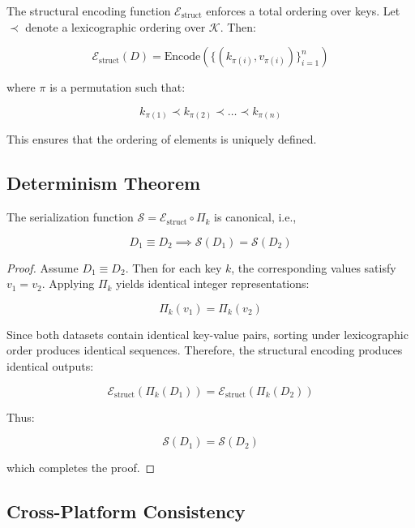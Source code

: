 The structural encoding function $\mathcal{E}_{\text{struct}}$ enforces a total ordering over keys. Let $\prec$ denote a lexicographic ordering over $\mathcal{K}$. Then:

\begin{equation}
\mathcal{E}_{\text{struct}}(D) = \text{Encode}(\{(k_{\pi(i)}, v_{\pi(i)})\}_{i=1}^{n})
\end{equation}

where $\pi$ is a permutation such that:

\begin{equation}
k_{\pi(1)} \prec k_{\pi(2)} \prec \dots \prec k_{\pi(n)}
\end{equation}

This ensures that the ordering of elements is uniquely defined.

\subsection{Determinism Theorem}

\begin{theorem}
The serialization function $\mathcal{S} = \mathcal{E}_{\text{struct}} \circ \Pi_k$ is canonical, i.e.,

\[
D_1 \equiv D_2 \implies \mathcal{S}(D_1) = \mathcal{S}(D_2)
\]
\end{theorem}

\begin{proof}
Assume $D_1 \equiv D_2$. Then for each key $k$, the corresponding values satisfy $v_1 = v_2$. Applying $\Pi_k$ yields identical integer representations:

\[
\Pi_k(v_1) = \Pi_k(v_2)
\]

Since both datasets contain identical key-value pairs, sorting under lexicographic order produces identical sequences. Therefore, the structural encoding produces identical outputs:

\[
\mathcal{E}_{\text{struct}}(\Pi_k(D_1)) = \mathcal{E}_{\text{struct}}(\Pi_k(D_2))
\]

Thus:

\[
\mathcal{S}(D_1) = \mathcal{S}(D_2)
\]

which completes the proof.
\end{proof}

\subsection{Cross-Platform Consistency}

